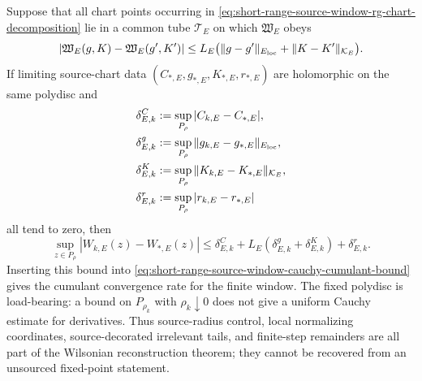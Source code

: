 Suppose that all chart points occurring in
\eqref{eq:short-range-source-window-rg-chart-decomposition} lie in a common
tube \(\mathcal T_E\) on which \(\mathfrak W_E\) obeys
\begin{equation}
  \left|
    \mathfrak W_E(g,K)-\mathfrak W_E(g',K')
  \right|
  \leq
  L_E\bigl(\|g-g'\|_{E_{\rm loc}}+\|K-K'\|_{\mathcal K_E}\bigr).
  \label{eq:short-range-source-window-chart-lipschitz}
\end{equation}
If limiting source-chart data
\((C_{\ast,E},g_{\ast,E},K_{\ast,E},r_{\ast,E})\) are holomorphic on the same
polydisc and
\begin{align}
  \delta^C_{E,k}
  &:=
  \sup_{P_\rho}|C_{k,E}-C_{\ast,E}|,\\
  \delta^g_{E,k}
  &:=
  \sup_{P_\rho}\|g_{k,E}-g_{\ast,E}\|_{E_{\rm loc}},\\
  \delta^K_{E,k}
  &:=
  \sup_{P_\rho}\|K_{k,E}-K_{\ast,E}\|_{\mathcal K_E},\\
  \delta^r_{E,k}
  &:=
  \sup_{P_\rho}|r_{k,E}-r_{\ast,E}|
\end{align}
all tend to zero, then
\begin{equation}
  \sup_{z\in P_\rho}|W_{k,E}(z)-W_{\ast,E}(z)|
  \leq
  \delta^C_{E,k}
  +
  L_E(\delta^g_{E,k}+\delta^K_{E,k})
  +
  \delta^r_{E,k}.
  \label{eq:short-range-source-window-chart-to-holomorphic-bound}
\end{equation}
Inserting this bound into
\eqref{eq:short-range-source-window-cauchy-cumulant-bound} gives the
cumulant convergence rate for the finite window.  The fixed polydisc is
load-bearing: a bound on \(P_{\rho_k}\) with \(\rho_k\downarrow0\) does not
give a uniform Cauchy estimate for derivatives.  Thus source-radius control,
local normalizing coordinates, source-decorated irrelevant tails, and
finite-step remainders are all part of the Wilsonian reconstruction theorem;
they cannot be recovered from an unsourced fixed-point statement.

